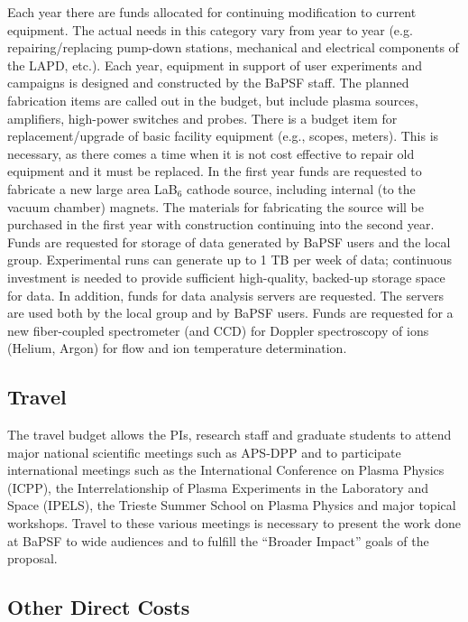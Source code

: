 \documentclass[11pt]{article}
\begin{document}
Each year there
are funds allocated for continuing modification to current equipment. The actual needs in this category
vary from year to year (e.g. repairing/replacing pump-down stations,
mechanical and electrical components of the LAPD, etc.).  Each year, equipment in support of
user experiments and campaigns is designed and constructed by the
BaPSF staff. The planned fabrication items are called out in the
budget, but include plasma sources, amplifiers, high-power switches
and probes.  There is a budget item for replacement/upgrade of basic facility
equipment (e.g., scopes, meters). This is necessary, as there comes a
time when it is not cost effective to repair old equipment and it must
be replaced. In the first year funds are requested to fabricate a new
large area LaB$_6$ cathode source, including internal (to the vacuum
chamber) magnets.  The materials for fabricating the source will be
purchased in the first year with construction continuing into the
second year.  Funds are requested for storage of data generated by
BaPSF users and the local group.  Experimental runs can generate up to 1 TB
per week of data; continuous investment is needed to provide
sufficient high-quality, backed-up storage space for data.  In
addition, funds for data analysis servers are requested.  The servers
are used both by the local group and by BaPSF users.  Funds are
requested for a new fiber-coupled spectrometer (and CCD) for Doppler
spectroscopy of ions (Helium, Argon) for flow and ion temperature
determination. 


\subsection*{Travel}

The travel budget allows the PIs, research staff and graduate students
to attend major national scientific meetings such as APS-DPP and to
participate international meetings such as the International
Conference on Plasma Physics (ICPP), the Interrelationship of Plasma
Experiments in the Laboratory and Space (IPELS), the Trieste Summer
School on Plasma Physics and major topical workshops. Travel to these
various meetings is necessary to present the work done at BaPSF to
wide audiences and to fulfill the “Broader Impact” goals of the
proposal.


\subsection*{Other Direct Costs}
\end{document}
